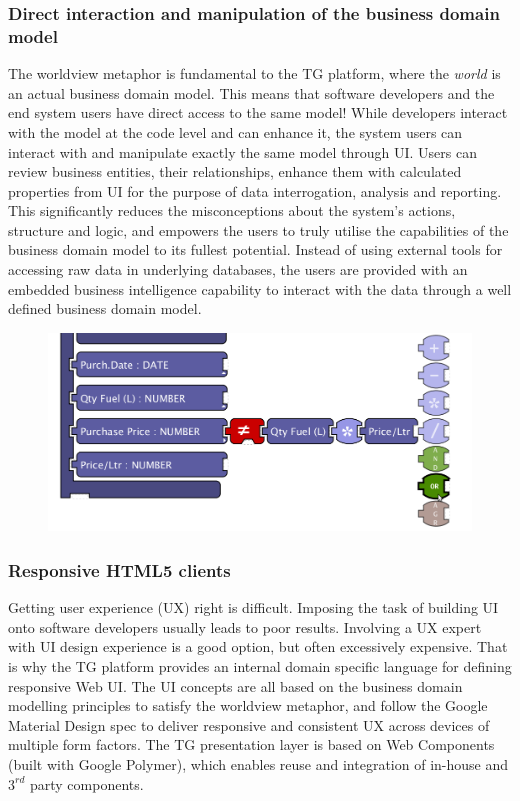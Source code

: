\documentclass[a4paper,10pt,twocolumn,oneside,openright,final]{memoir}
\begin{document}
\subsubsection*{Direct interaction and manipulation of the business domain model}
	The worldview metaphor is fundamental to the TG platform, where the \emph{world} is an actual business domain model.
	This means that software developers and the end system users have direct access to the same model!
	While developers interact with the model at the code level and can enhance it, the system users can interact with and manipulate exactly the same model through UI.
	Users can review business entities, their relationships, enhance them with calculated properties from UI for the purpose of data interrogation, analysis and reporting.
	This significantly reduces the misconceptions about the system's actions, structure and logic, and empowers the users to truly utilise the capabilities of the business domain model to its fullest potential.
	Instead of using external tools for accessing raw data in underlying databases, the users are provided with an embedded business intelligence capability to interact with the data through a well defined business domain model.
	\begin{figure}[!h]
  		\centering
  		\includegraphics[scale=0.20]{images/01-rulesarea-suggestionmenu.png}  
		\vspace{-30pt} 
  	\end{figure}

	\BgThispage
\subsubsection*{Responsive HTML5 clients}
	Getting user experience (UX) right is difficult.
	Imposing the task of building UI onto software developers usually leads to poor results.
	Involving a UX expert with UI design experience is a good option, but often excessively expensive.
	That is why the TG platform provides an internal domain specific language for defining responsive Web UI.
	The UI concepts are all based on the business domain modelling principles to satisfy the worldview metaphor, and follow the Google Material Design spec to deliver responsive and consistent UX across devices of multiple form factors.
	The TG presentation layer is based on Web Components (built with Google Polymer), which enables reuse and integration of in-house and $3^{rd}$ party components.
\end{document}
